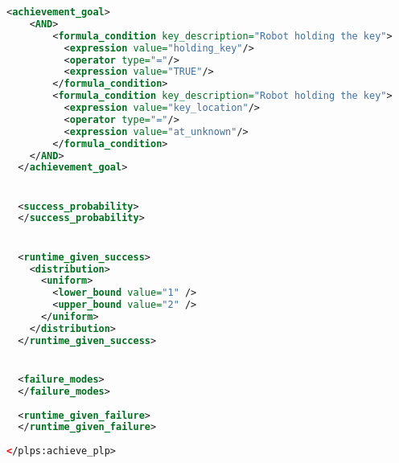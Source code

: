 \begin{lstlisting}[style=stylexml,language=XML]
  <achievement_goal>
    <AND>
        <formula_condition key_description="Robot holding the key">
          <expression value="holding_key"/>
          <operator type="="/>
          <expression value="TRUE"/>
        </formula_condition>
        <formula_condition key_description="Robot holding the key">
          <expression value="key_location"/>
          <operator type="="/>
          <expression value="at_unknown"/>
        </formula_condition>
    </AND>
  </achievement_goal>


  <success_probability>
  </success_probability>


  <runtime_given_success>
    <distribution>
      <uniform>
        <lower_bound value="1" />
        <upper_bound value="2" />
      </uniform>
    </distribution>
  </runtime_given_success>


  <failure_modes>
  </failure_modes>
  
  <runtime_given_failure>
  </runtime_given_failure>
  
</plps:achieve_plp>
	\end{lstlisting}
